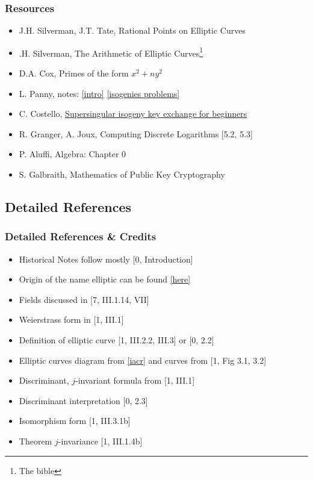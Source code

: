 \documentclass{beamer}
\begin{document}
\begin{frame}[noframenumbering]
    \frametitle{Resources}
    \begin{itemize}
        \item [0]  J.H. Silverman, J.T. Tate, Rational Points on Elliptic Curves 
        \item [1].H. Silverman, The Arithmetic of Elliptic Curves\footnote{The bible}
        \item [2] D.A. Cox, Primes of the form $x^2 + n y^2$
        \item [3,4] L. Panny, notes: \href{https://yx7.cc/docs/misc/isog_bristol_notes.pdf}{[intro]} \href{https://yx7.cc/docs/misc/isogprob_bristol_notes.pdf}{[isogenies problems]}
        \item [5]C. Costello, \href{https://eprint.iacr.org/2019/1321.pdf}{Supersingular isogeny key exchange for beginners}
        \item [6]R. Granger, A. Joux, Computing Discrete Logarithms [5.2, 5.3]
        \item [7]P. Aluffi, Algebra: Chapter 0
        \item [8]S. Galbraith, Mathematics of Public Key Cryptography
    \end{itemize}
\end{frame}
\subsection{Detailed References}
\begin{frame}[noframenumbering]
   \frametitle{Detailed References \& Credits}
   \begin{itemize}
       \item Historical Notes follow mostly [0, Introduction]
       \item Origin of the name elliptic can be found \href{https://www.unf.edu/~ddreibel/mas4932/elliptic-integrals.pdf}{[here]}
       \item Fields discussed in [7, III.1.14, VII]
       \item Weierstrass form in [1, III.1] 
       \item Definition of elliptic curve [1, III.2.2, III.3] or  [0, 2.2]
       \item Elliptic curves diagram from \href{https://www.iacr.org/authors/tikz/}{[iacr]} and curves from [1, Fig 3.1, 3.2]
       \item Discriminant, $j$-invariant formula from [1, III.1]
       \item Discriminant interpretation [0, 2.3]
       \item Isomorphism form [1, III.3.1b]
       \item Theorem $j$-invariance [1, III.1.4b]
       
   \end{itemize}
\end{frame}
\end{document}
